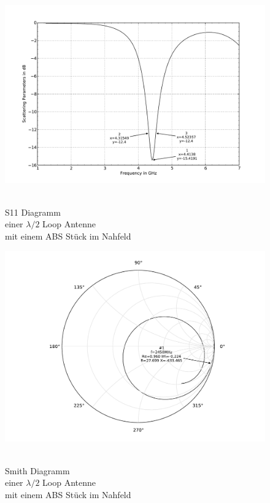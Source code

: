 \begin{figure}[!ht]
\begin{center}
  \includegraphics[width=\linewidth]{content/bilder/Evaluation/Loop/L2/1ABS/S11_Loop_Lambda2_mitABS.pdf}
  \caption{\\S11 Diagramm \\einer $\lambda/2$ Loop Antenne \\mit einem ABS Stück im Nahfeld}\label{fig:S11_Lambda2_Loop_1ABS_3}
\endminipage%
{}
  \includegraphics[width=\linewidth]{content/bilder/Evaluation/Loop/L2/1ABS/Smith_Loop_Lambda2_mitABS.pdf}
  \caption{\\Smith Diagramm \\einer $\lambda/2$ Loop Antenne \\ mit einem ABS Stück im Nahfeld}\label{fig:Smith_Lambda2_Loop_1ABS_4}
\endminipage
\end{center}
\end{figure}

